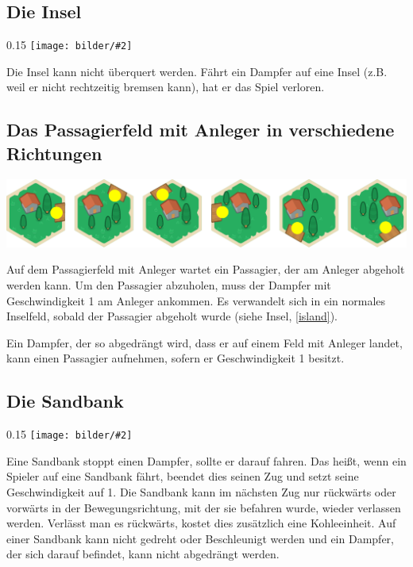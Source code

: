 \documentclass[12pt,a4paper, ngerman, oneside]{scrartcl}
\newcommand{\fieldGraphic}[2]{%
\begin{floatingfigure}[#1]{0.15\textwidth}%
  \centering
  \texttt{[image: bilder/\#2]}%
\end{floatingfigure}%
}
\begin{document}
\subsection{\label{island}Die Insel}

\fieldGraphic{r}{insel}

Die Insel kann nicht überquert werden. Fährt ein Dampfer auf eine Insel (z.B.
weil er nicht rechtzeitig bremsen kann), hat er das Spiel verloren.

\paragraph{}

\subsection{\label{passenger}Das Passagierfeld mit Anleger in verschiedene Richtungen}

\includegraphics[width=\textwidth]{bilder/passagier}

Auf dem Passagierfeld mit Anleger wartet ein Passagier, der am Anleger abgeholt
werden kann. Um den Passagier abzuholen, muss der Dampfer mit Geschwindigkeit 1
am Anleger ankommen. Es verwandelt sich in ein normales Inselfeld, sobald der
Passagier abgeholt wurde (siehe Insel, \ref{island}).

Ein Dampfer, der so abgedrängt wird, dass er auf einem Feld mit Anleger landet,
kann einen Passagier aufnehmen, sofern er Geschwindigkeit 1 besitzt.


\subsection{\label{sandbank}Die Sandbank}

\fieldGraphic{r}{sandbank}

Eine Sandbank stoppt einen Dampfer, sollte er darauf fahren. Das heißt, wenn ein
Spieler auf eine Sandbank fährt, beendet dies seinen Zug und setzt seine
Geschwindigkeit auf 1. Die Sandbank kann im nächsten Zug nur rückwärts oder
vorwärts in der Bewegungsrichtung, mit der sie befahren wurde, wieder verlassen
werden. Verlässt man es rückwärts, kostet dies zusätzlich eine Kohleeinheit. Auf
einer Sandbank kann nicht gedreht oder Beschleunigt werden und ein Dampfer, der
sich darauf befindet, kann nicht abgedrängt werden.
\end{document}
